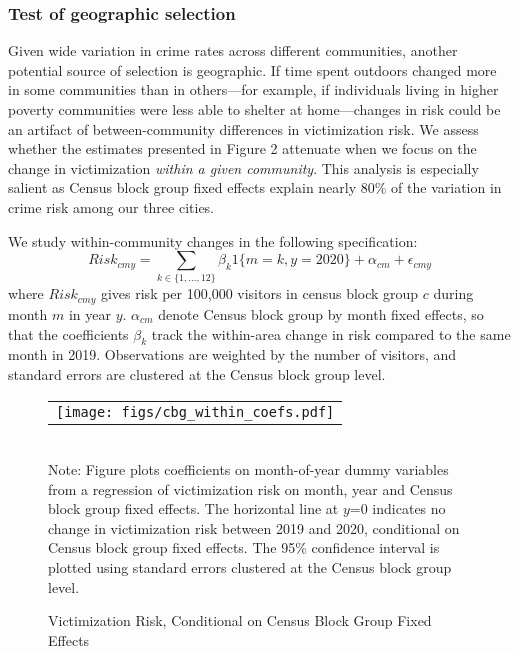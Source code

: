 \subsubsection{Test of geographic selection}
Given wide variation in crime rates across different communities, another potential source of selection is geographic. If time spent outdoors changed more in some communities than in others---for example, if individuals living in higher poverty communities were less able to shelter at home---changes in risk could be an artifact of between-community differences in victimization risk. We assess whether the estimates presented in Figure 2 attenuate when we focus on the change in victimization \emph{within a given community}. This analysis is especially salient as Census block group fixed effects explain nearly 80\% of the variation in crime risk among our three cities.

We study within-community changes in the following specification:
\begin{equation}
Risk_{cmy} = \sum_{k \in \{1,...,12\}} \beta_k 1\{m=k, y=2020\} + \alpha_{cm} + \epsilon_{cmy} 
\end{equation}
where $Risk_{cmy}$ gives risk per 100,000 visitors in census block group $c$ during month $m$ in year $y$. $\alpha_{cm}$ denote Census block group by month fixed effects, so that the coefficients $\beta_k$ track the within-area change in risk compared to the same month in 2019. Observations are weighted by the number of visitors, and standard errors are clustered at the Census block group level. 

\begin{figure}
     \begin{center}
    \caption{Victimization Risk, Conditional on Census Block Group Fixed Effects}
    \begin{tabular}{c}
     \texttt{[image: figs/cbg\_within\_coefs.pdf]}    \\
 
    \end{tabular}
    \label{fig:awesome}
         \end{center}
        \vspace*{0mm}  \\ 
        \newline 
Note: Figure plots coefficients on month-of-year dummy variables  from a regression of victimization risk on month, year and Census block group fixed effects. The horizontal line at $y$=0 indicates no change in victimization risk between 2019 and 2020, conditional on Census block group fixed effects. The 95\% confidence interval is plotted using standard errors clustered at the Census block group level.
\end{figure}


